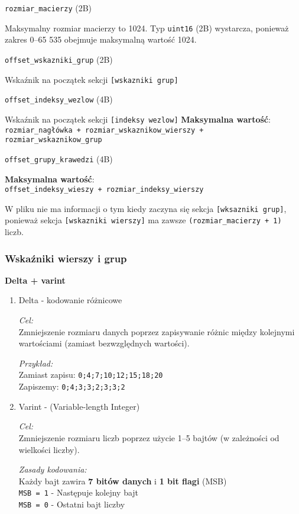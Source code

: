 \documentclass[]{article}
\begin{document}
\texttt{rozmiar\_macierzy} (2B)
\begin{itemize}
Maksymalny rozmiar macierzy to 1024. Typ \texttt{uint16} (2B) wystarcza, ponieważ zakres 0–65 535 obejmuje maksymalną wartość 1024.

\end{itemize}

\texttt{offset\_wskazniki\_grup} (2B)
\begin{itemize}
Wskaźnik na początek sekcji \texttt{[wskazniki grup]}
\end{itemize}

\texttt{offset\_indeksy\_wezlow} (4B)
\begin{itemize}
Wskaźnik na początek sekcji \texttt{[indeksy wezlow]}
\textbf{Maksymalna wartość}:\\
\texttt{rozmiar\_nagłówka + rozmiar\_wskaznikow\_wierszy + rozmiar\_wskaznikow\_grup}\\


\end{itemize}

    \texttt{offset\_grupy\_krawedzi} (4B)
    \begin{itemize}
        \textbf{Maksymalna wartość}:\\
\texttt{offset\_indeksy\_wieszy + rozmiar\_indeksy\_wierszy}\\
    \end{itemize}

    W pliku nie ma informacji o tym kiedy zaczyna się sekcja \texttt{[wksazniki grup]}, ponieważ sekcja \texttt{[wskazniki wierszy]} ma zawsze \texttt{(rozmiar\_macierzy + 1)} liczb.
    
\subsubsection{Wskaźniki wierszy i grup}
\textbf{Delta + varint}
\begin{enumerate}
    \item 
    Delta - kodowanie różnicowe
    
    \emph{Cel:}
    \\ Zmniejszenie rozmiaru danych poprzez zapisywanie różnic między kolejnymi wartościami (zamiast bezwzględnych wartości).

    \emph{Przykład:}\\
    Zamiast zapisu: \texttt{0;4;7;10;12;15;18;20}\\
    Zapiszemy: \texttt{0;4;3;3;2;3;3;2}

    \item 
    Varint - (Variable-length Integer)

    \emph{Cel:}\\
    Zmniejszenie rozmiaru liczb poprzez użycie 1–5 bajtów (w zależności od wielkości liczby).

    \emph{Zasady kodowania:}\\
    Każdy bajt zawira \textbf{7 bitów danych} i \textbf{1 bit flagi} (MSB)\\
    \texttt{MSB = 1} - Następuje kolejny bajt\\
    \texttt{MSB = 0} - Ostatni bajt liczby
\end{enumerate}
\end{document}
